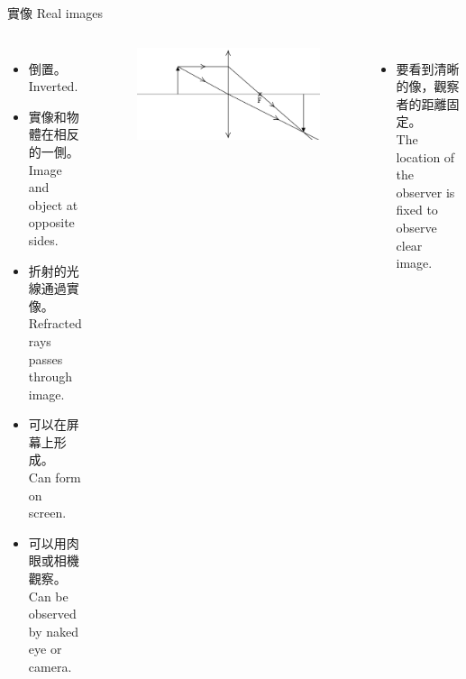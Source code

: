 \documentclass[beamer=true]{standalone}
\begin{document}

\begin{frame}
    {實像 Real images}
    \begin{columns}
        \begin{itemize}
            \setlength{\itemsep}{.6em}
            \item 倒置。\\Inverted.
            \item 實像和物體在相反的一側。\\Image and object at opposite sides.
            \item 折射的光線通過實像。\\Refracted rays passes through image.
            \item 可以在屏幕上形成。\\Can form on screen.
            \item 可以用肉眼或相機觀察。\\Can be observed by naked eye or camera.
        \end{itemize}
        \begin{figure}
            \centering
            \includegraphics[width=\linewidth]{../../assets/x1eni1me.png}
        \end{figure}\bigskip
        \begin{itemize}
            \item 要看到清晰的像，觀察者的距離固定。\\The location of the observer is fixed to observe clear image.
        \end{itemize}
    \end{columns}



\end{frame}
\end{document}
